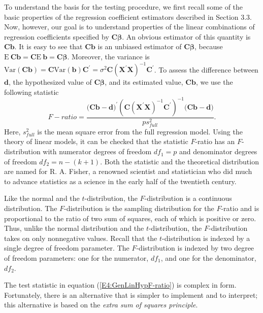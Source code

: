 To understand the basis for the testing procedure, we first recall
some of the basic properties of the regression coefficient
estimators described in Section 3.3. Now, however, our goal is to
understand properties of the linear combinations of regression
coefficients specified by $\mathbf{C\boldsymbol \beta } $. An
obvious estimator of this quantity is $\mathbf{Cb}$. It is easy to
see that $\mathbf{Cb}$ is an unbiased estimator of
$\mathbf{C\boldsymbol \beta }$, because $
\mathrm{E~}\mathbf{Cb=C}\mathrm{E~}\mathbf{b=C\boldsymbol \beta }$.
Moreover, the
variance is $\mathrm{Var}\left( \mathbf{Cb}\right) \mathbf{=C}\mathrm{Var}%
\left( \mathbf{b}\right) \mathbf{C}^{\prime}=\sigma
^{2}\mathbf{C}\left( \mathbf{X^{\prime}X}\right)
^{-1}\mathbf{C}^{\prime}$. To assess the difference between
$\mathbf{d}$, the hypothesized value of $\mathbf{C \boldsymbol \beta
}$, and its
estimated value, $\mathbf{Cb}$, we use the following statistic%
\begin{equation}\label{E4:GenLinHypF-ratio}
F-ratio=\frac{(\mathbf{Cb-d)}^{\prime}\left( \mathbf{C}\left(
\mathbf{X^{\prime}X} \right) ^{-1}\mathbf{C}^{\prime}\right)
^{-1}(\mathbf{Cb-d)}}{ps_{full}^{2}}.
\end{equation}
Here, $s_{full}^{2}$ is the mean square error from the full
regression model. Using the theory of linear models, it can be
checked that the statistic $F$-ratio has an $F$-distribution with
numerator degrees of freedom $df_1=p$ and denominator degrees of
freedom $df_2=n-(k+1)$. Both the statistic and the theoretical
distribution are named for R. A. Fisher, a renowned scientist and
statistician who did much to advance statistics as a science in the
early half of the twentieth century.

Like the normal and the $t$-distribution, the $F$-distribution is a
continuous distribution. The $F$-distribution is the sampling
distribution for the $F$-ratio and is proportional to the ratio of
two sum of squares, each of which is positive or zero. Thus, unlike
the normal distribution and the $t$-distribution, the
$F$-distribution takes on only nonnegative values. Recall that the
$t$-distribution is indexed by a single degree of freedom parameter.
The $F$-distribution is indexed by two degree of freedom
parameters: one for the numerator, $df_1$, and one for the denominator, $%
df_2$.

The test statistic in equation (\ref{E4:GenLinHypF-ratio}) is
complex in form. Fortunately, there is an alternative that is
simpler to implement and to interpret; this alternative is based on
the \emph{extra sum of squares principle}.

